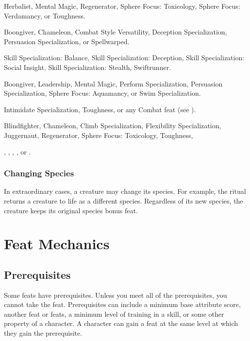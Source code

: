             Herbalist, Mental Magic, Regenerator, Sphere Focus: Toxicology, Sphere Focus: Verdamancy, or Toughness.

             Boongiver, Chameleon, Combat Style Versatility, Deception Specialization, Persuasion Specialization, or Spellwarped.

             Skill Specialization: Balance, Skill Specialization: Deception, Skill Specialization: Social Insight, Skill Specialization: Stealth, Swiftrunner.

             Boongiver, Leadership, Mental Magic, Perform Specialization, Persuasion Specialization, Sphere Focus: Aquamancy, or Swim Specialization.

             Intimidate Specialization, Toughness, or any Combat feat (see ).

             Blindfighter, Chameleon, Climb Specialization, Flexibility Specialization, Juggernaut, Regenerator, Sphere Focus: Toxicology, Toughness,

             , , , , or .

        \subsubsection{Changing Species}
            In extraordinary cases, a creature may change its species.
            For example, the  ritual returns a creature to life as a different species.
            Regardless of its new species, the creature keeps its original species bonus feat.

\section{Feat Mechanics}

    \subsection{Prerequisites}
        Some feats have prerequisites.
        Unless you meet all of the prerequisites, you cannot take the feat.
        Prerequisites can include a minimum base attribute score, another feat or feats, a minimum level of training in a skill, or some other property of a character.
        A character can gain a feat at the same level at which they gain the prerequisite.

